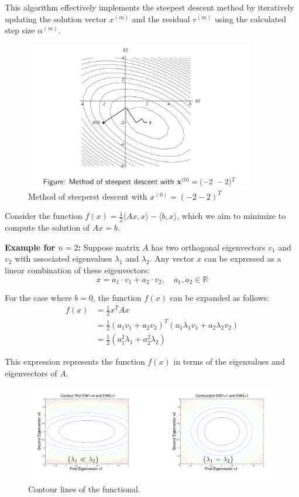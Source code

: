 \documentclass[unicode,11pt,a4paper,oneside,numbers=endperiod,openany]{scrartcl}
\begin{document}
This algorithm effectively implements the steepest descent method by iteratively updating the solution vector \( x^{(m)} \) and the residual \( r^{(m)} \) using the calculated step size \( \alpha^{(m)} \).
\begin{figure}[H]
    \centering
    \includegraphics[trim=0cm 5cm 0cm 0cm, clip, width=10cm]{img6.png}
    \caption{Method of steeperst descent with $x^{(0)}=(-2 -2)^T$}
    \label{fig:img6}
\end{figure}
Consider the function \( f(x) = \frac{1}{2} \langle Ax, x \rangle - \langle b, x \rangle \), which we aim to minimize to compute the solution of \( Ax = b \).

\textbf{Example for \( n = 2 \):}
Suppose matrix \( A \) has two orthogonal eigenvectors \( v_1 \) and \( v_2 \) with associated eigenvalues \( \lambda_1 \) and \( \lambda_2 \). Any vector \( x \) can be expressed as a linear combination of these eigenvectors:
\[
x = a_1 \cdot v_1 + a_2 \cdot v_2, \quad a_1, a_2 \in \mathbb{R}
\]

For the case where \( b = 0 \), the function \( f(x) \) can be expanded as follows:
\begin{align*}
f(x) &= \frac{1}{2}x^T A x \\
&= \frac{1}{2}(a_1 v_1 + a_2 v_2)^T (a_1 \lambda_1 v_1 + a_2 \lambda_2 v_2) \\
&= \frac{1}{2}(a_1^2 \lambda_1 + a_2^2 \lambda_2)
\end{align*}

This expression represents the function \( f(x) \) in terms of the eigenvalues and eigenvectors of \( A \).

\begin{figure}[H]
    \centering
    \includegraphics[trim=0cm 0cm 0cm 0cm, clip, width=15cm]{img7.png}
    \caption{Contour lines of the functional.}
    \label{fig:img7}
\end{figure}
\end{document}
